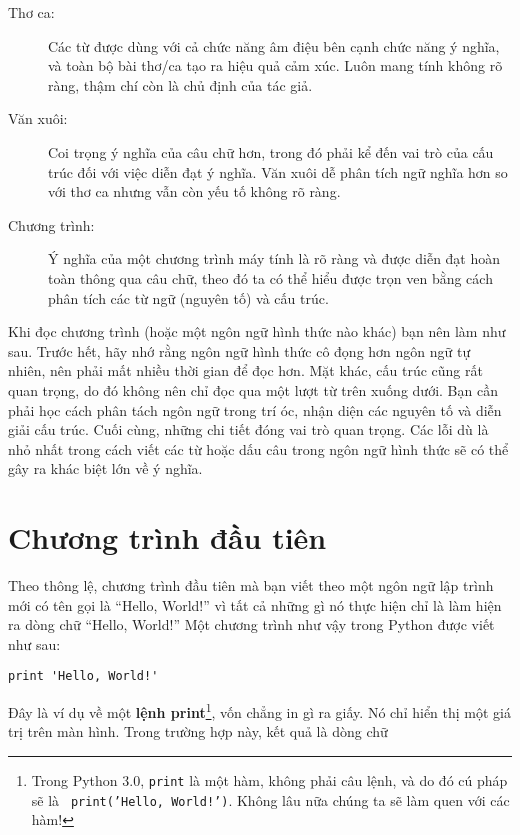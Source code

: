 \documentclass[11pt]{book}
\begin{document}
\begin{description}

\item[Thơ ca:] Các từ được dùng với cả chức năng âm điệu bên cạnh
chức năng ý nghĩa, và toàn bộ bài thơ/ca tạo ra hiệu quả cảm xúc.
Luôn mang tính không rõ ràng, thậm chí còn là chủ định của
tác giả.

\item[Văn xuôi:] Coi trọng ý nghĩa của câu chữ hơn, trong đó phải kể đến
vai trò của cấu trúc đối với việc diễn đạt ý nghĩa. Văn xuôi dễ phân tích ngữ
nghĩa hơn so với thơ ca nhưng vẫn còn yếu tố không rõ ràng.

\item[Chương trình:] Ý nghĩa của một chương trình máy tính là rõ ràng
và được diễn đạt hoàn toàn thông qua câu chữ, theo đó ta có thể hiểu được
trọn ven bằng cách phân tích các từ ngữ (nguyên tố) và cấu trúc.
\end{description}

Khi đọc chương trình (hoặc một ngôn ngữ hình thức nào khác) bạn nên làm
như sau. Trước hết, hãy nhớ rằng ngôn ngữ hình thức cô đọng hơn ngôn ngữ
tự nhiên, nên phải mất nhiều thời gian để đọc hơn. Mặt khác, cấu trúc cũng
rất quan trọng, do đó không nên chỉ đọc qua một lượt từ trên xuống dưới.
Bạn cần phải học cách phân tách ngôn ngữ trong trí óc, nhận diện các
nguyên tố và diễn giải cấu trúc. Cuối cùng, những chi tiết đóng vai trò quan
trọng. Các lỗi dù là nhỏ nhất trong cách viết các từ hoặc dấu câu trong 
ngôn ngữ hình thức sẽ có thể gây ra khác biệt lớn về ý nghĩa.

\section{Chương trình đầu tiên}
\label{hello}


Theo thông lệ, chương trình đầu tiên mà bạn viết theo một ngôn ngữ
lập trình mới có tên gọi là ``Hello, World!'' vì tất cả những gì nó
thực hiện chỉ là làm hiện ra dòng chữ ``Hello, World!'' Một chương trình
như vậy trong Python được viết như sau:

\beforeverb
\begin{verbatim}
print 'Hello, World!'
\end{verbatim}
\afterverb
%
Đây là ví dụ về một {\bf lệnh print}\footnote{Trong Python 3.0,
  {\tt print} là một hàm, không phải câu lệnh, và do đó cú pháp sẽ là {\tt
    print('Hello, World!')}. Không lâu nữa chúng ta sẽ làm quen với
các hàm!}, vốn chẳng in gì ra giấy. Nó chỉ hiển thị một giá trị trên màn
hình. Trong trường hợp này, kết quả là dòng chữ
\end{document}
